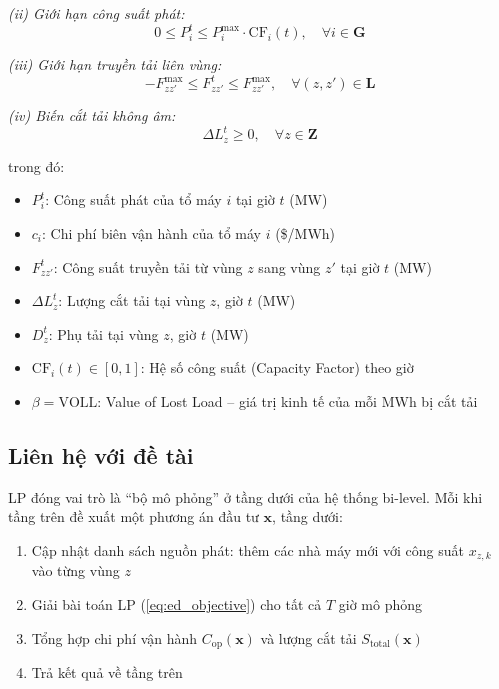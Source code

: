 \noindent \textit{(ii) Giới hạn công suất phát:}
\begin{equation}
    0 \leq P_i^t \leq P_i^{\max} \cdot \text{CF}_i(t),
    \quad \forall i \in \mathbf{G}
    \label{eq:gen_limit}
\end{equation}

\noindent \textit{(iii) Giới hạn truyền tải liên vùng:}
\begin{equation}
    -F_{zz'}^{\max} \leq F_{zz'}^t \leq F_{zz'}^{\max},
    \quad \forall (z, z') \in \mathbf{L}
    \label{eq:transfer_limit}
\end{equation}

\noindent \textit{(iv) Biến cắt tải không âm:}
\begin{equation}
    \Delta L_z^t \geq 0,
    \quad \forall z \in \mathbf{Z}
    \label{eq:shed_nonneg}
\end{equation}

\noindent trong đó:
\begin{itemize}
    \item $P_i^t$: Công suất phát của tổ máy $i$ tại giờ $t$ (MW)
    \item $c_i$: Chi phí biên vận hành của tổ máy $i$ (\$/MWh)
    \item $F_{zz'}^t$: Công suất truyền tải từ vùng $z$ sang vùng $z'$ tại giờ $t$ (MW)
    \item $\Delta L_z^t$: Lượng cắt tải tại vùng $z$, giờ $t$ (MW)
    \item $D_z^t$: Phụ tải tại vùng $z$, giờ $t$ (MW)
    \item $\text{CF}_i(t) \in [0, 1]$: Hệ số công suất (Capacity Factor) theo giờ
    \item $\beta = \text{VOLL}$: Value of Lost Load -- giá trị kinh tế của mỗi MWh bị cắt tải
\end{itemize}

\iffalse
\subsection{Liên hệ với đề tài}

LP đóng vai trò là ``bộ mô phỏng'' ở tầng dưới của hệ thống bi-level. Mỗi khi tầng trên đề xuất một phương án đầu tư $\mathbf{x}$, tầng dưới:
\begin{enumerate}
    \item Cập nhật danh sách nguồn phát: thêm các nhà máy mới với công suất $x_{z,k}$ vào từng vùng $z$
    \item Giải bài toán LP (\ref{eq:ed_objective}) cho tất cả $T$ giờ mô phỏng
    \item Tổng hợp chi phí vận hành $C_{\text{op}}(\mathbf{x})$ và lượng cắt tải $S_{\text{total}}(\mathbf{x})$
    \item Trả kết quả về tầng trên
\end{enumerate}

